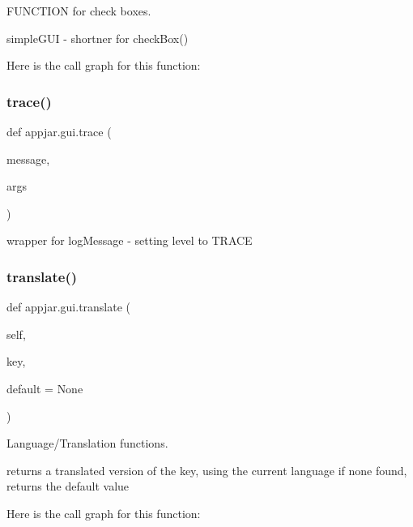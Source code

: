 \begin{DoxyVerb}
F\+U\+N\+C\+T\+I\+ON for check boxes. 

\begin{DoxyVerb}simpleGUI - shortner for checkBox() \end{DoxyVerb}
 Here is the call graph for this function\+:
\mbox{\label{classappjar_1_1gui_ad70fee01cb2dbb2f5daef089c7e33884}} 
\subsubsection{\texorpdfstring{trace()}{trace()}}
{\footnotesize\ttfamily def appjar.\+gui.\+trace (\begin{DoxyParamCaption}\item[{}]{message,  }\item[{}]{args }\end{DoxyParamCaption})\hspace{0.3cm}{\ttfamily [static]}}

\begin{DoxyVerb}wrapper for logMessage - setting level to TRACE \end{DoxyVerb}
 \mbox{\label{classappjar_1_1gui_a799b0aab5dbf6b53ab9c7ef1d197565d}} 
\subsubsection{\texorpdfstring{translate()}{translate()}}
{\footnotesize\ttfamily def appjar.\+gui.\+translate (\begin{DoxyParamCaption}\item[{}]{self,  }\item[{}]{key,  }\item[{}]{default = {\ttfamily None} }\end{DoxyParamCaption})}



Language/\+Translation functions. 

\begin{DoxyVerb}returns a translated version of the key, using the current language
    if none found, returns the default value \end{DoxyVerb}
 Here is the call graph for this function\+:
\mbox{\label{classappjar_1_1gui_a02a38bc6cd67859779121e194edb93a4}} 

\end{DoxyVerb}

